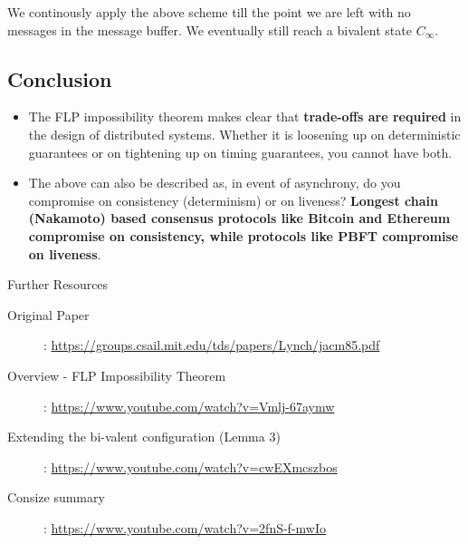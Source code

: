 We continously apply the above scheme till the point we are left with no messages in the message buffer. We eventually still reach a bivalent state $C_{\infty}$.

\subsection{Conclusion}
\begin{itemize}
    \item The FLP impossibility theorem makes clear that \textbf{trade-offs are required} in the design of distributed systems. Whether it is loosening up on deterministic guarantees or on tightening up on timing guarantees, you cannot have both.
    \item The above can also be described as, in event of asynchrony, do you compromise on consistency (determinism) or on liveness? \textbf{Longest chain (Nakamoto) based consensus protocols like Bitcoin and Ethereum compromise on consistency, while protocols like PBFT compromise on liveness}.
\end{itemize}

\begin{refbox}{Further Resources}
    \small
    \begin{description}
        \item [Original Paper]: \href{https://groups.csail.mit.edu/tds/papers/Lynch/jacm85.pdf}{https://groups.csail.mit.edu/tds/papers/Lynch/jacm85.pdf}
        \item [Overview - FLP Impossibility Theorem]: \href{https://www.youtube.com/watch?v=Vmlj-67aymw}{https://www.youtube.com/watch?v=Vmlj-67aymw}
        \item [Extending the bi-valent configuration (Lemma 3)]: \href{https://www.youtube.com/watch?v=cwEXmcszbos}{https://www.youtube.com/watch?v=cwEXmcszbos}
        \item [Consize summary]: \href{https://www.youtube.com/watch?v=2fnS-f-mwIo}{https://www.youtube.com/watch?v=2fnS-f-mwIo}
    \end{description}
\end{refbox}